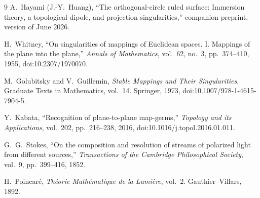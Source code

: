 \documentclass[11pt]{article}
\theoremstyle{definition}
\begin{document}
\begin{thebibliography}{9}
A.~Hayami (J.-Y.~Huang),
``The orthogonal-circle ruled surface: Immersion theory, a topological
dipole, and projection singularities,'' companion preprint, version of
June 2026.

H.~Whitney,
``On singularities of mappings of Euclidean spaces. I. Mappings of the plane
into the plane,''
\emph{Annals of Mathematics}, vol.~62, no.~3, pp.~374--410, 1955,
doi:10.2307/1970070.

M.~Golubitsky and V.~Guillemin,
\emph{Stable Mappings and Their Singularities}, Graduate Texts in
Mathematics, vol.~14. Springer, 1973,
doi:10.1007/978-1-4615-7904-5.

Y.~Kabata,
``Recognition of plane-to-plane map-germs,''
\emph{Topology and its Applications}, vol.~202, pp.~216--238, 2016,
doi:10.1016/j.topol.2016.01.011.

G.~G.~Stokes,
``On the composition and resolution of streams of polarized light from
different sources,''
\emph{Transactions of the Cambridge Philosophical Society}, vol.~9,
pp.~399--416, 1852.

H.~Poincar\'e,
\emph{Th\'eorie Math\'ematique de la Lumi\`ere}, vol.~2.
Gauthier--Villars, 1892.
\end{thebibliography}
\end{document}
